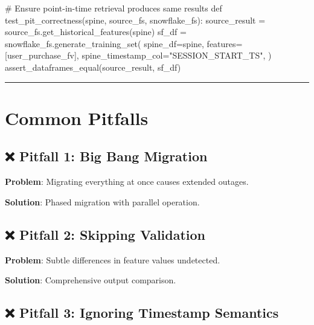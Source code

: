 \documentclass[
  letterpaper,
  DIV=11,
  numbers=noendperiod]{scrreprt}
\newenvironment{Shaded}{\begin{snugshade}}{\end{snugshade}}
\newcommand{\CommentTok}[1]{\textcolor[rgb]{0.37,0.37,0.37}{#1}}
\newcommand{\KeywordTok}[1]{\textcolor[rgb]{0.00,0.23,0.31}{#1}}
\newcommand{\NormalTok}[1]{\textcolor[rgb]{0.00,0.23,0.31}{#1}}
\newcommand{\OperatorTok}[1]{\textcolor[rgb]{0.37,0.37,0.37}{#1}}
\newcommand{\StringTok}[1]{\textcolor[rgb]{0.13,0.47,0.30}{#1}}
\begin{document}
\begin{Shaded}
\begin{Highlighting}[]
\CommentTok{\# Ensure point{-}in{-}time retrieval produces same results}
\KeywordTok{def}\NormalTok{ test\_pit\_correctness(spine, source\_fs, snowflake\_fs):}
\NormalTok{    source\_result }\OperatorTok{=}\NormalTok{ source\_fs.get\_historical\_features(spine)}
\NormalTok{    sf\_df }\OperatorTok{=}\NormalTok{ snowflake\_fs.generate\_training\_set(}
\NormalTok{        spine\_df}\OperatorTok{=}\NormalTok{spine,}
\NormalTok{        features}\OperatorTok{=}\NormalTok{[user\_purchase\_fv],}
\NormalTok{        spine\_timestamp\_col}\OperatorTok{=}\StringTok{"SESSION\_START\_TS"}\NormalTok{,}
\NormalTok{    )}
\NormalTok{    assert\_dataframes\_equal(source\_result, sf\_df)}
\end{Highlighting}
\end{Shaded}

\begin{center}\rule{0.5\linewidth}{0.5pt}\end{center}

\hypertarget{common-pitfalls-11}{%
\section{Common Pitfalls}\label{common-pitfalls-11}}

\hypertarget{pitfall-1-big-bang-migration}{%
\subsection{❌ Pitfall 1: Big Bang
Migration}\label{pitfall-1-big-bang-migration}}

\textbf{Problem}: Migrating everything at once causes extended outages.

\textbf{Solution}: Phased migration with parallel operation.

\hypertarget{pitfall-2-skipping-validation}{%
\subsection{❌ Pitfall 2: Skipping
Validation}\label{pitfall-2-skipping-validation}}

\textbf{Problem}: Subtle differences in feature values undetected.

\textbf{Solution}: Comprehensive output comparison.

\hypertarget{pitfall-3-ignoring-timestamp-semantics}{%
\subsection{❌ Pitfall 3: Ignoring Timestamp
Semantics}\label{pitfall-3-ignoring-timestamp-semantics}}
\end{document}
